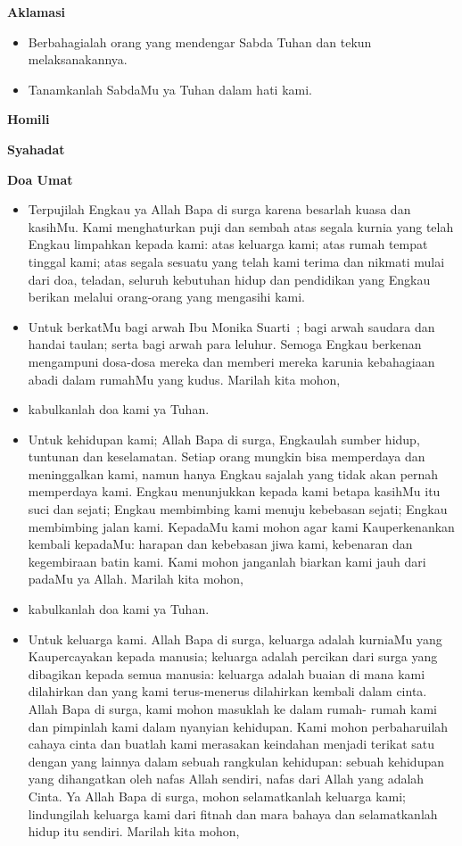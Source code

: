 \documentclass[a5paper,headsepline,titlepage,11pt,nnormalheadings,DIVcalc]{scrbook}
\makeatletter
\newcommand{\subjudul}[1]{%
  {\parindent \z@ 
    \interlinepenalty\@M \bfseries #1\par\nobreak \vskip 10\p@ }}
\newcommand{\BU}[1]{\begin{itemize} \item[U:] #1 \end{itemize}}
\newcommand{\BI}[1]{\begin{itemize} \item[I:] #1 \end{itemize}}
\newcommand{\BP}[1]{\begin{itemize} \item[P:] #1 \end{itemize}}
\newcommand{\namaalm}{Ibu Monika Suarti~}
\makeatother
\begin{document}
\subjudul{Aklamasi}

\BI{Berbahagialah orang yang mendengar Sabda Tuhan dan 
tekun melaksanakannya.}

\BU{Tanamkanlah SabdaMu ya Tuhan dalam hati kami.}

 

\subjudul{Homili}

\subjudul{Syahadat} 

\subjudul{Doa Umat}

\BI{Terpujilah Engkau ya Allah Bapa di surga karena besarlah kuasa 
dan kasihMu. Kami menghaturkan puji dan sembah atas segala 
kurnia yang telah Engkau limpahkan kepada kami: atas keluarga 
kami; atas rumah tempat tinggal kami; atas segala sesuatu yang 
telah kami terima dan nikmati mulai dari doa, teladan, seluruh 
kebutuhan hidup dan pendidikan yang Engkau berikan melalui 
orang-orang yang mengasihi kami.}

\BP{Untuk berkatMu bagi arwah \namaalm; bagi arwah saudara 
dan handai taulan; serta bagi arwah para leluhur. Semoga 
Engkau berkenan mengampuni dosa-dosa mereka dan 
memberi mereka karunia kebahagiaan abadi dalam rumahMu 
yang kudus. Marilah kita mohon,}

\BU{kabulkanlah doa kami ya Tuhan.} 

\BP{Untuk kehidupan kami; Allah Bapa di surga, Engkaulah 
sumber hidup, tuntunan dan keselamatan. Setiap orang 
mungkin bisa memperdaya dan meninggalkan kami, namun 
hanya Engkau sajalah yang tidak akan pernah memperdaya 
kami. Engkau menunjukkan kepada kami betapa kasihMu itu 
suci dan sejati; Engkau membimbing kami menuju kebebasan 
sejati; Engkau membimbing jalan kami. KepadaMu kami 
mohon agar kami Kauperkenankan kembali kepadaMu: 
harapan dan kebebasan jiwa kami, kebenaran dan 
kegembiraan batin kami. Kami mohon janganlah biarkan 
kami jauh dari padaMu ya Allah. Marilah kita mohon,}

\BU{kabulkanlah doa kami ya Tuhan.} 

\BP{Untuk keluarga kami. Allah Bapa di surga, keluarga adalah 
kurniaMu yang Kaupercayakan kepada manusia; keluarga 
adalah percikan dari surga yang dibagikan kepada semua 
manusia: keluarga adalah buaian di mana kami dilahirkan dan 
yang kami terus-menerus dilahirkan kembali dalam cinta. 
Allah Bapa di surga, kami mohon masuklah ke dalam rumah-
rumah kami dan pimpinlah kami dalam nyanyian kehidupan. 
Kami mohon perbaharuilah cahaya cinta dan buatlah kami 
merasakan keindahan menjadi terikat satu dengan yang 
lainnya dalam sebuah rangkulan kehidupan: sebuah 
kehidupan yang dihangatkan oleh nafas Allah sendiri, nafas 
dari Allah yang adalah Cinta. Ya Allah Bapa di surga, mohon 
selamatkanlah keluarga kami; lindungilah keluarga kami dari 
fitnah dan mara bahaya dan selamatkanlah hidup itu sendiri. 
Marilah kita mohon,}
\end{document}
